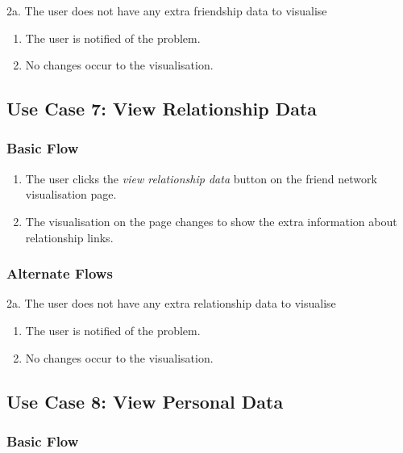 \documentclass[12pt,onecolumn]{article}
\begin{document}
		2a. The user does not have any extra friendship data to visualise

		\begin{enumerate}
			\item The user is notified of the problem.

			\item No changes occur to the visualisation.

		\end{enumerate}

	\subsection{Use Case 7: View Relationship Data}

		\subsubsection{Basic Flow}

		\begin{enumerate}
			\item The user clicks the \emph{view relationship data} button on the friend network visualisation page.

			\item The visualisation on the page changes to show the extra information about relationship links. 	

		\end{enumerate}

		\subsubsection{Alternate Flows}

		2a. The user does not have any extra relationship data to visualise

		\begin{enumerate}
			\item The user is notified of the problem.

			\item No changes occur to the visualisation.

		\end{enumerate}

	\subsection{Use Case 8: View Personal Data}

		\subsubsection{Basic Flow}
\end{document}
